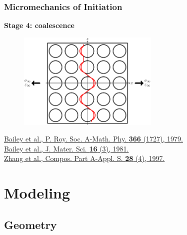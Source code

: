 \documentclass[first,firstsupp,lastsupp,last,hyperref,table]{ETHclass}
\begin{document}
\begin{frame}
\frametitle{\vspace{0.2cm}\small Micromechanics of Initiation}
\vspace{-0.5cm}
\centering
\begin{alertblock}{\centering\scriptsize\bf Stage 4: coalescence}
\vspace{-0.25cm}
\begin{figure}
\centering
\includegraphics[width=0.6\textwidth]{stage4-coalescence.pdf}
\end{figure}
\end{alertblock}
\vspace{-0.5cm}
\pgfmathsetmacro{}
\pgfmathsetmacro{}
{\fontsize{\fontsizeref}{\stretchref} \selectfont \href{https://doi.org/10.1098/rspa.1979.0071}{Bailey et al., P. Roy. Soc. A-Math. Phy. \textbf{366} (1727), 1979.}}\\\vspace{-5pt}
{\fontsize{\fontsizeref}{\stretchref} \selectfont \href{https://doi.org/10.1007/BF00552203}{Bailey et al., J. Mater. Sci. \textbf{16} (3), 1981.}}\\\vspace{-5pt}
{\fontsize{\fontsizeref}{\stretchref} \selectfont \href{https://doi.org/10.1016/S1359-835X(96)00123-6}{Zhang et al., Compos. Part A-Appl. S. \textbf{28} (4), 1997.}}
\end{frame}


\section{Modeling}

\subsection{Geometry}
\end{document}
